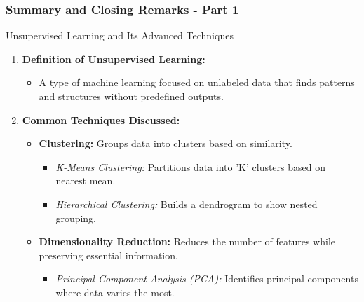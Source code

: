 \documentclass[aspectratio=169]{beamer}
\begin{document}
\begin{frame}[fragile]
  \frametitle{Summary and Closing Remarks - Part 1}
  \begin{block}{Unsupervised Learning and Its Advanced Techniques}
    \begin{enumerate}
      \item \textbf{Definition of Unsupervised Learning:}
      \begin{itemize}
        \item A type of machine learning focused on unlabeled data that finds patterns and structures without predefined outputs.
      \end{itemize}

      \item \textbf{Common Techniques Discussed:}
      \begin{itemize}
        \item \textbf{Clustering:} Groups data into clusters based on similarity.
          \begin{itemize}
            \item \textit{K-Means Clustering:} Partitions data into 'K' clusters based on nearest mean.
            \item \textit{Hierarchical Clustering:} Builds a dendrogram to show nested grouping.
          \end{itemize}
  
        \item \textbf{Dimensionality Reduction:} Reduces the number of features while preserving essential information.
          \begin{itemize}
            \item \textit{Principal Component Analysis (PCA):} Identifies principal components where data varies the most.
          \end{itemize}
      \end{itemize}
    \end{enumerate}
  \end{block}
\end{frame}
\end{document}
